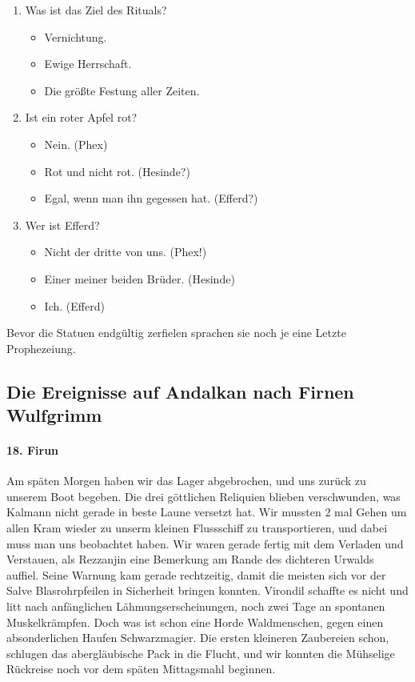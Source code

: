 \begin{enumerate}
\begin{itemize}
\end{itemize}
\item Was ist das Ziel des Rituals?
\begin{itemize}
\item Vernichtung.
\item Ewige Herrschaft.
\item Die größte Festung aller Zeiten.
\end{itemize}
\item Ist ein roter Apfel rot?
\begin{itemize}
\item Nein. (Phex)
\item Rot und nicht rot. (Hesinde?)
\item Egal, wenn man ihn gegessen hat. (Efferd?)
\end{itemize}
\item Wer ist Efferd?
\begin{itemize}
\item Nicht der dritte von uns. (Phex!)
\item Einer meiner beiden Brüder. (Hesinde)
\item Ich. (Efferd)
\end{itemize}
\end{enumerate}
Bevor die Statuen endgültig zerfielen sprachen sie noch je eine Letzte Prophezeiung.

\subsection{Die Ereignisse auf Andalkan nach Firnen Wulfgrimm}

\paragraph{18. Firun}
Am späten Morgen haben wir das Lager abgebrochen, und uns zurück zu unserem Boot begeben. Die drei göttlichen Reliquien blieben verschwunden, was Kalmann nicht gerade in beste Laune versetzt hat. Wir mussten 2 mal Gehen um allen Kram wieder zu unserm kleinen Flussschiff zu transportieren, und dabei muss man uns beobachtet haben. Wir waren gerade fertig mit dem Verladen und Verstauen, als Rezzanjin eine Bemerkung am Rande des dichteren Urwalds auffiel. Seine Warnung kam gerade rechtzeitig, damit die meisten sich vor der Salve Blasrohrpfeilen in Sicherheit bringen konnten. Virondil schaffte es nicht und litt nach anfänglichen Lähmungserscheinungen, noch zwei Tage an spontanen Muskelkrämpfen. Doch was ist schon eine Horde Waldmenschen, gegen einen absonderlichen Haufen Schwarzmagier. Die ersten kleineren Zaubereien schon, schlugen das abergläubische Pack in die Flucht, und wir konnten die Mühselige Rückreise noch vor dem späten Mittagsmahl beginnen.

